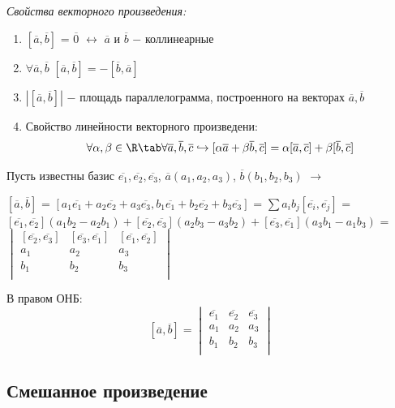 \textit{Свойства векторного произведения:}

\begin{enumerate}
    \item $[\overline{a}, \overline{b}]$ = $\overline{0}$ $\longleftrightarrow$ $\overline{a}$ и $\overline{b}$ $-$ коллинеарные
    \item $\forall\overline{a}, \overline{b}$ $[\overline{a}, \overline{b}] = - [\overline{b}, \overline{a}]$
    \item $|[\overline{a}, \overline{b}]|$ $-$ площадь параллелограмма, построенного на векторах $\overline{a}, \overline{b}$
    \item Свойство линейности векторного произведени:
    \[
    \forall\alpha, \beta \in \R\tab\forall\overline{a}, \overline{b}, \overline{c}\hookrightarrow[\alpha\overline{a} + \beta\overline{b}, \overline{c}] = \alpha[\overline{a}, \overline{c}] + \beta[\overline{b}, \overline{c}]
    \]
\end{enumerate}

Пусть известны базис $\overline{e_1}, \overline{e_2}, \overline{e_3}$, $\overline{a}(a_1, a_2, a_3)$, $\overline{b}(b_1, b_2, b_3)$ $\longrightarrow$ 

\begin{center}
    $[\overline{a}, \overline{b}]$ = $[a_1\overline{e_1} + a_2\overline{e_2} + a_3\overline{e_3}, b_1\overline{e_1} + b_2\overline{e_2} + b_3\overline{e_3}]$ = $\sum a_i b_j [\overline{e_i}, \overline{e_j}]$ = $[\overline{e_1}, \overline{e_2}](a_1 b_2 - a_2 b_1) + [\overline{e_2}, \overline{e_3}](a_2 b_3 - a_3 b_2) + [\overline{e_3}, \overline{e_1}](a_3 b_1 - a_1 b_3)$ = 
    $\begin{vmatrix}
        [\overline{e_2}, \overline{e_3}] & [\overline{e_3}, \overline{e_1}] & [\overline{e_1}, \overline{e_2}]\\
        a_1 & a_2 & a_3\\
        b_1 & b_2 & b_3\\
    \end{vmatrix}$
\end{center}

В правом ОНБ:
\[
    [\overline{a}, \overline{b}] = 
    \begin{vmatrix}
        \overline{e_1} & \overline{e_2} & \overline{e_3}\\
        a_1 & a_2 & a_3\\
        b_1 & b_2 & b_3\\
    \end{vmatrix}
\]
\subsection{Смешанное произведение}

